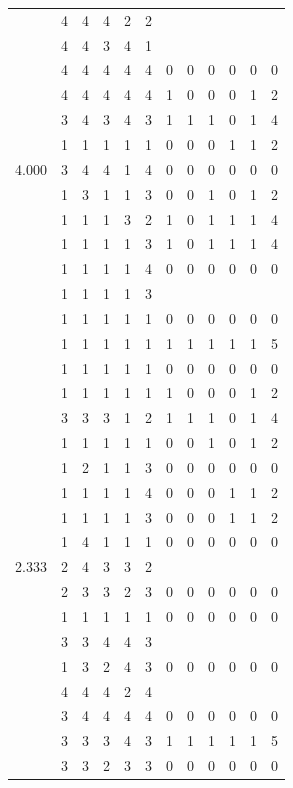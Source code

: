 \documentclass[]{msu-thesis}
\theoremstyle{definition}
\theoremstyle{definition}
\theoremstyle{definition}
\theoremstyle{remark}
\begin{document}
\begin{table}
{\begin{tabular}[t]{rrrrrrrrrrrr}
 & 4 & 4 & 4 & 2 & 2 &  &  &  &  &  & \\
 & 4 & 4 & 3 & 4 & 1 &  &  &  &  &  & \\
 & 4 & 4 & 4 & 4 & 4 & 0 & 0 & 0 & 0 & 0 & 0\\
 & 4 & 4 & 4 & 4 & 4 & 1 & 0 & 0 & 0 & 1 & 2\\
 & 3 & 4 & 3 & 4 & 3 & 1 & 1 & 1 & 0 & 1 & 4\\
 & 1 & 1 & 1 & 1 & 1 & 0 & 0 & 0 & 1 & 1 & 2\\
4.000 & 3 & 4 & 4 & 1 & 4 & 0 & 0 & 0 & 0 & 0 & 0\\
 & 1 & 3 & 1 & 1 & 3 & 0 & 0 & 1 & 0 & 1 & 2\\
 & 1 & 1 & 1 & 3 & 2 & 1 & 0 & 1 & 1 & 1 & 4\\
 & 1 & 1 & 1 & 1 & 3 & 1 & 0 & 1 & 1 & 1 & 4\\
 & 1 & 1 & 1 & 1 & 4 & 0 & 0 & 0 & 0 & 0 & 0\\
 & 1 & 1 & 1 & 1 & 3 &  &  &  &  &  & \\
 & 1 & 1 & 1 & 1 & 1 & 0 & 0 & 0 & 0 & 0 & 0\\
 & 1 & 1 & 1 & 1 & 1 & 1 & 1 & 1 & 1 & 1 & 5\\
 & 1 & 1 & 1 & 1 & 1 & 0 & 0 & 0 & 0 & 0 & 0\\
 & 1 & 1 & 1 & 1 & 1 & 1 & 0 & 0 & 0 & 1 & 2\\
 & 3 & 3 & 3 & 1 & 2 & 1 & 1 & 1 & 0 & 1 & 4\\
 & 1 & 1 & 1 & 1 & 1 & 0 & 0 & 1 & 0 & 1 & 2\\
 & 1 & 2 & 1 & 1 & 3 & 0 & 0 & 0 & 0 & 0 & 0\\
 & 1 & 1 & 1 & 1 & 4 & 0 & 0 & 0 & 1 & 1 & 2\\
 & 1 & 1 & 1 & 1 & 3 & 0 & 0 & 0 & 1 & 1 & 2\\
 & 1 & 4 & 1 & 1 & 1 & 0 & 0 & 0 & 0 & 0 & 0\\
2.333 & 2 & 4 & 3 & 3 & 2 &  &  &  &  &  & \\
 & 2 & 3 & 3 & 2 & 3 & 0 & 0 & 0 & 0 & 0 & 0\\
 & 1 & 1 & 1 & 1 & 1 & 0 & 0 & 0 & 0 & 0 & 0\\
 & 3 & 3 & 4 & 4 & 3 &  &  &  &  &  & \\
 & 1 & 3 & 2 & 4 & 3 & 0 & 0 & 0 & 0 & 0 & 0\\
 & 4 & 4 & 4 & 2 & 4 &  &  &  &  &  & \\
 & 3 & 4 & 4 & 4 & 4 & 0 & 0 & 0 & 0 & 0 & 0\\
 & 3 & 3 & 3 & 4 & 3 & 1 & 1 & 1 & 1 & 1 & 5\\
 & 3 & 3 & 2 & 3 & 3 & 0 & 0 & 0 & 0 & 0 & 0\\

\end{tabular}}
\end{table}
\end{document}
